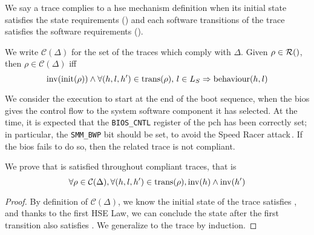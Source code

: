 We say a trace complies to a \ac{hse} mechanism definition when its initial
state satisfies the state requirements () and each software
transitions of the trace satisfies the software requirements ().
%
\begin{definition}
  We write $\mathcal{C}(\Delta)$ for the set of the traces which comply with
  $\Delta$.
  Given $\rho \in \pathesLTS{Ez}$, then $\rho \in \mathcal{C}(\Delta)$ iff
  \[
    \mathrm{inv}(\mathrm{init}(\rho)) \wedge \forall (h,l,h') \in
    \mathrm{trans}(\rho)\text{, }l \in L_S \Rightarrow \mathrm{behaviour}(h, l)
  \]
\end{definition}

\begin{example}
  We consider the execution to start at the end of the boot sequence, when the
  \ac{bios} gives the control flow to the system software component it has
  selected.
  At the time, it is expected that the \texttt{BIOS\_CNTL} register of the
  \ac{pch} has been correctly set; in particular, the \texttt{SMM\_BWP} bit
  should be set, to avoid the Speed Racer
  attack\,\cite{kallenberg2015racecondition}.
  If the \ac{bios} fails to do so, then the related trace is not compliant.
\end{example}

\begin{lemma}
  \label{lemma:speccert:hseinv}
  We prove that  is satisfied throughout compliant traces, that is
  \[
    \forall \rho \in \mathcal{C}(\Delta), \forall (h, l, h') \in
    \mathrm{trans}(\rho), \mathrm{inv}(h) \wedge \mathrm{inv}(h')
  \]

  \begin{proof}
    By definition of $\mathcal{C}(\Delta)$, we know the initial state of the
    trace satisfies , and thanks to the first HSE Law, we can conclude
    the state after the first transition also satisfies .
    We generalize to the trace by induction.
  \end{proof}
\end{lemma}

